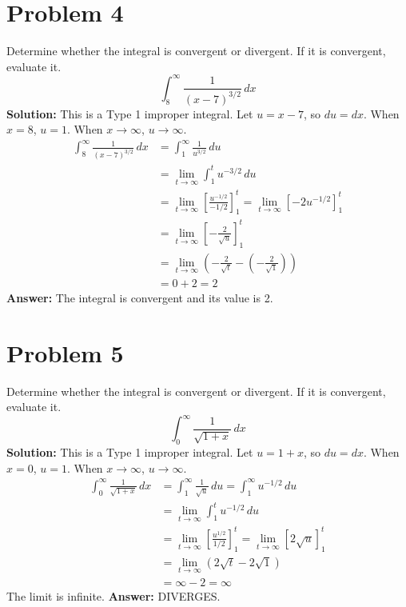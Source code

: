 \documentclass{article}
\begin{document}
\section{Problem 4}
Determine whether the integral is convergent or divergent. If it is convergent, evaluate it.
\[ \int_{8}^{\infty} \frac{1}{(x-7)^{3/2}} \,dx \]
\textbf{Solution:}
This is a Type 1 improper integral. Let $u = x-7$, so $du = dx$. When $x=8$, $u=1$. When $x \to \infty$, $u \to \infty$.
\begin{align*}
    \int_{8}^{\infty} \frac{1}{(x-7)^{3/2}} \,dx &= \int_{1}^{\infty} \frac{1}{u^{3/2}} \,du \\
    &= \lim_{t \to \infty} \int_{1}^{t} u^{-3/2} \,du \\
    &= \lim_{t \to \infty} \left[ \frac{u^{-1/2}}{-1/2} \right]_{1}^{t} = \lim_{t \to \infty} \left[ -2u^{-1/2} \right]_{1}^{t} \\
    &= \lim_{t \to \infty} \left[ -\frac{2}{\sqrt{u}} \right]_{1}^{t} \\
    &= \lim_{t \to \infty} \left( -\frac{2}{\sqrt{t}} - \left(-\frac{2}{\sqrt{1}}\right) \right) \\
    &= 0 + 2 = 2
\end{align*}
\textbf{Answer:} The integral is convergent and its value is 2.

\section{Problem 5}
Determine whether the integral is convergent or divergent. If it is convergent, evaluate it.
\[ \int_{0}^{\infty} \frac{1}{\sqrt{1+x}} \,dx \]
\textbf{Solution:}
This is a Type 1 improper integral. Let $u = 1+x$, so $du = dx$. When $x=0$, $u=1$. When $x \to \infty$, $u \to \infty$.
\begin{align*}
    \int_{0}^{\infty} \frac{1}{\sqrt{1+x}} \,dx &= \int_{1}^{\infty} \frac{1}{\sqrt{u}} \,du = \int_{1}^{\infty} u^{-1/2} \,du \\
    &= \lim_{t \to \infty} \int_{1}^{t} u^{-1/2} \,du \\
    &= \lim_{t \to \infty} \left[ \frac{u^{1/2}}{1/2} \right]_{1}^{t} = \lim_{t \to \infty} \left[ 2\sqrt{u} \right]_{1}^{t} \\
    &= \lim_{t \to \infty} (2\sqrt{t} - 2\sqrt{1}) \\
    &= \infty - 2 = \infty
\end{align*}
The limit is infinite.
\textbf{Answer:} DIVERGES.
\end{document}
